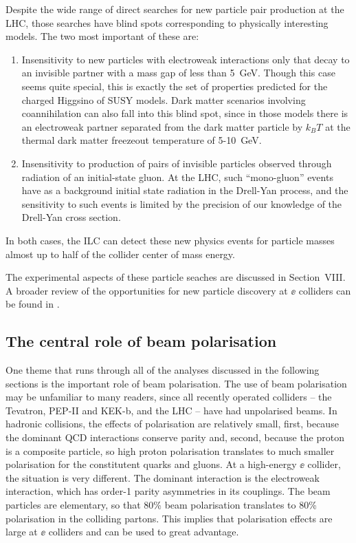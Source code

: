 Despite the wide range of direct searches for new particle pair production at the LHC, 
those searches have blind spots corresponding to physically interesting models.  The two most important of these are:
\begin{enumerate}
\item  Insensitivity to new particles with electroweak interactions only that decay to an invisible partner with a mass gap of less than 5~GeV.   Though this case seems quite special, this is exactly the set of properties predicted for the charged Higgsino of SUSY models.  Dark matter scenarios involving coannihilation can also fall into this blind spot, since in those models there is an electroweak partner separated from the dark matter particle by $k_B T$ at the thermal dark matter freezeout temperature of 5-10~GeV.
\item Insensitivity to production of pairs of invisible particles observed through radiation of an initial-state gluon.   At the LHC, such ``mono-gluon'' events have as a background initial state radiation in the Drell-Yan process, and the sensitivity to such events is limited by the precision of our knowledge of the Drell-Yan cross section.
\end{enumerate}
In both cases, the ILC can detect these new physics events for particle masses almost up to half of  the collider center of mass energy.

The experimental aspects of these particle seaches are discussed in Section~VIII.  A broader review of the opportunities for new particle discovery at $\ee$ colliders can be found in \cite{Fujii:2017ekh}.

\subsection{The central role of beam polarisation}
\label{subsec:beampol}

One theme that runs through all of the analyses discussed in the following sections is the  important role of beam polarisation.   The use of beam polarisation may be unfamiliar to many readers, since all recently operated colliders -- the Tevatron, PEP-II and KEK-b, and the LHC -- have had unpolarised beams.   In hadronic 
collisions, the effects of polarisation are relatively small, first, because the dominant QCD interactions conserve parity and, second, because the proton is a composite particle, so high proton polarisation translates to much smaller polarisation for the constitutent quarks and gluons.   At a high-energy $\ee$ collider, the situation is very different.  The dominant interaction is the electroweak interaction, which has 
order-1 parity asymmetries in its couplings.  The beam particles are elementary, so that 80\% beam polarisation translates to 80\% polarisation in the colliding partons.
This implies  that polarisation effects are large at $\ee$  colliders and can be used to great advantage.   

